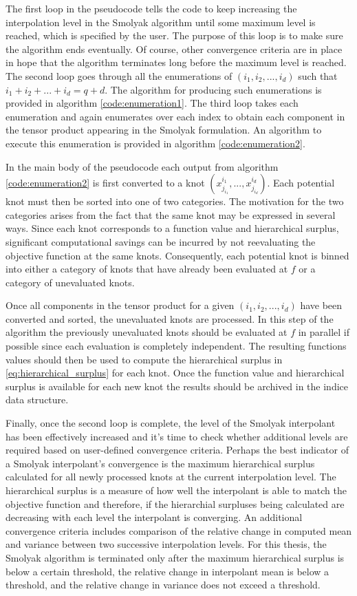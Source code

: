 The first loop in the pseudocode tells the code to keep increasing the interpolation level in the Smolyak algorithm until some maximum level is reached, which is specified by the user. The purpose of this loop is to make sure the algorithm ends eventually. Of course, other convergence criteria are in place in hope that the algorithm terminates long before the maximum level is reached. The second loop goes through all the enumerations of $(i_1,i_2,...,i_d)$ such that $i_1 + i_2 + ... + i_d = q+d$. The algorithm for producing such enumerations is provided in algorithm \ref{code:enumeration1}. The third loop takes each enumeration and again enumerates over each index to obtain each component in the tensor product appearing in the Smolyak formulation. An algorithm to execute this enumeration is provided in algorithm \ref{code:enumeration2}.

In the main body of the pseudocode each output from algorithm \ref{code:enumeration2} is first converted to a knot $(x^{i_1}_{j_{i_1}}, ..., x^{i_d}_{j_{i_d}})$. Each potential knot must then be sorted into one of two categories. The motivation for the two categories arises from the fact that the same knot may be expressed in several ways. Since each knot corresponds to a function value and hierarchical surplus, significant computational savings can be incurred by not reevaluating the objective function at the same knots. Consequently, each potential knot is binned into either a category of knots that have already been evaluated at $f$ or a category of unevaluated knots.

Once all components in the tensor product for a given $(i_1,i_2,...,i_d)$ have been converted and sorted, the unevaluated knots are processed. In this step of the algorithm the previously unevaluated knots should be evaluated at $f$ in parallel if possible since each evaluation is completely independent. The resulting functions values should then be used to compute the hierarchical surplus in \ref{eq:hierarchical_surplus} for each knot. Once the function value and hierarchical surplus is available for each new knot the results should be archived in the indice data structure.     

Finally, once the second loop is complete, the level of the Smolyak interpolant has been effectively increased and it's time to check whether additional levels are required based on user-defined convergence criteria. Perhaps the best indicator of a Smolyak interpolant's convergence is the maximum hierarchical surplus calculated for all newly processed knots at the current interpolation level. The hierarchical surplus is a measure of how well the interpolant is able to match the objective function and therefore, if the hierarchial surpluses being calculated are decreasing with each level the interpolant is converging. An additional convergence criteria includes comparison of the relative change in computed mean and variance between two successive interpolation levels. For this thesis, the Smolyak algorithm is terminated only after the maximum hierarchical surplus is below a certain threshold, the relative change in interpolant mean is below a threshold, and the relative change in variance does not exceed a threshold. 